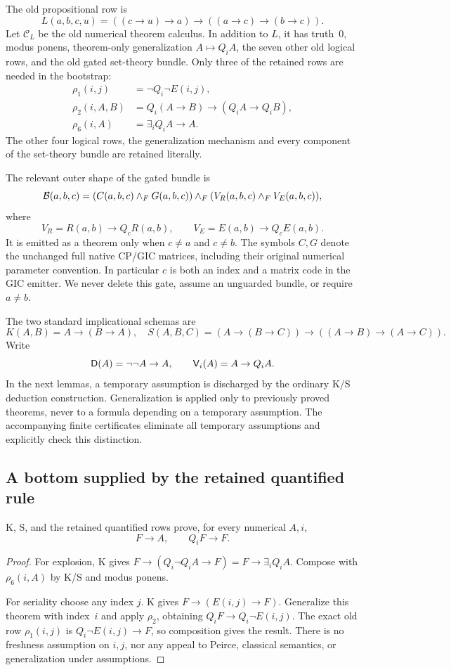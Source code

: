 The old propositional row is
\[
 L(a,b,c,u)=((c\to u)\to a)\to((a\to c)\to(b\to c)).
\]
Let $\mathcal C_L$ be the old numerical theorem calculus. In addition to
$L$, it has truth~0, modus ponens, theorem-only generalization
$A\mapsto Q_iA$, the seven other old logical rows, and the old gated
set-theory bundle. Only three of the retained rows are needed in the
bootstrap:
\begin{align*}
 \rho_1(i,j)&=\neg Q_i\neg E(i,j),\\
 \rho_2(i,A,B)&=Q_i(A\to B)\to(Q_iA\to Q_iB),\\
 \rho_6(i,A)&=\exists_i Q_iA\to A.
\end{align*}
The other four logical rows, the generalization mechanism and every
component of the set-theory bundle are retained literally.

The relevant outer shape of the gated bundle is
\[
 \mathcal B(a,b,c)=
 (C(a,b,c)\mathbin{\wedge_F} G(a,b,c))\mathbin{\wedge_F}
 (V_R(a,b,c)\mathbin{\wedge_F} V_E(a,b,c)),
\]
where
\[
 V_R=R(a,b)\to Q_cR(a,b),\qquad
 V_E=E(a,b)\to Q_cE(a,b).
\]
It is emitted as a theorem only when $c\ne a$ and $c\ne b$.
The symbols $C,G$ denote the unchanged full native CP/GIC matrices,
including their original numerical parameter convention. In particular
$c$ is both an index and a matrix code in the GIC emitter. We never
delete this gate, assume an unguarded bundle, or require $a\ne b$.

The two standard implicational schemas are
\[
 K(A,B)=A\to(B\to A),
 \quad
 S(A,B,C)=(A\to(B\to C))\to((A\to B)\to(A\to C)).
\]
Write
\[
 \mathsf{D}(A)=\neg\neg A\to A,
 \qquad \mathsf{V}_{i}(A)=A\to Q_iA.
\]
In the next lemmas, a temporary assumption is discharged by the ordinary
K/S deduction construction. Generalization is applied only to previously
proved theorems, never to a formula depending on a temporary assumption.
The accompanying finite certificates eliminate all temporary assumptions
and explicitly check this distinction.

\subsection{A bottom supplied by the retained quantified rule}

\begin{lemma}
\label{lem:ksefq}
K, S, and the retained quantified rows prove, for every numerical $A,i$,
\[
 F\to A,\qquad Q_iF\to F.
\]
\end{lemma}
\begin{proof}
For explosion, K gives
$F\to(Q_i\neg Q_iA\to F)=F\to\exists_iQ_iA$.
Compose with $\rho_6(i,A)$ by K/S and modus ponens.

For seriality choose any index $j$. K gives
$F\to(E(i,j)\to F)$. Generalize this theorem with index~$i$ and apply
$\rho_2$, obtaining $Q_iF\to Q_i\neg E(i,j)$. The exact old row
$\rho_1(i,j)$ is $Q_i\neg E(i,j)\to F$, so composition gives the result.
There is no freshness assumption on $i,j$, nor any appeal to Peirce,
classical semantics, or generalization under assumptions.
\end{proof}

